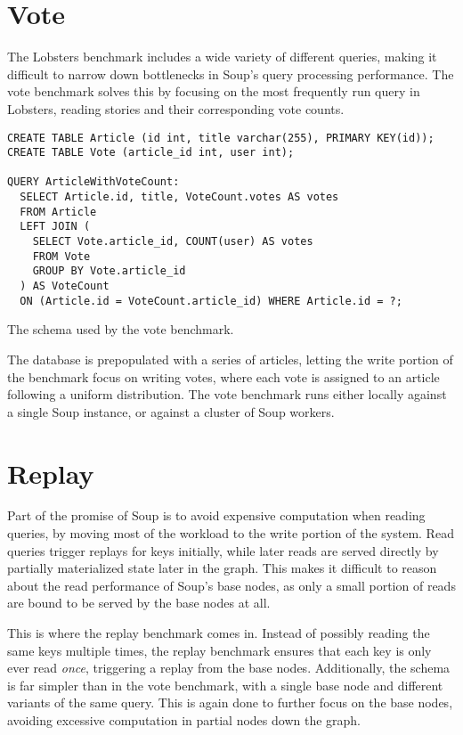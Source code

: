 \section{Vote}

The Lobsters benchmark includes a wide variety of different queries, making it
difficult to narrow down bottlenecks in Soup's query processing performance. The
vote benchmark solves this by focusing on the most frequently run query in
Lobsters, reading stories and their corresponding vote counts.

\begin{listing}[H]
  \begin{verbatim}
CREATE TABLE Article (id int, title varchar(255), PRIMARY KEY(id));
CREATE TABLE Vote (article_id int, user int);

QUERY ArticleWithVoteCount:
  SELECT Article.id, title, VoteCount.votes AS votes
  FROM Article
  LEFT JOIN (
    SELECT Vote.article_id, COUNT(user) AS votes
    FROM Vote
    GROUP BY Vote.article_id
  ) AS VoteCount
  ON (Article.id = VoteCount.article_id) WHERE Article.id = ?;
  \end{verbatim}

  \caption{The schema used by the vote benchmark.}\label{lst:vote}
\end{listing}

The database is prepopulated with a series of articles, letting the write
portion of the benchmark focus on writing votes, where each vote is assigned to
an article following a uniform distribution. The vote benchmark runs either
locally against a single Soup instance, or against a cluster of Soup workers.


\section{Replay}

Part of the promise of Soup is to avoid expensive computation when reading
queries, by moving most of the workload to the write portion of the system. Read
queries trigger replays for keys initially, while later reads are served
directly by partially materialized state later in the graph. This makes it
difficult to reason about the read performance of Soup's base nodes, as only a
small portion of reads are bound to be served by the base nodes at all.

This is where the replay benchmark comes in. Instead of possibly reading the
same keys multiple times, the replay benchmark ensures that each key is only
ever read \textit{once}, triggering a replay from the base nodes. Additionally,
the schema is far simpler than in the vote benchmark, with a single base node
and different variants of the same query. This is again done to further focus on
the base nodes, avoiding excessive computation in partial nodes down the graph.

